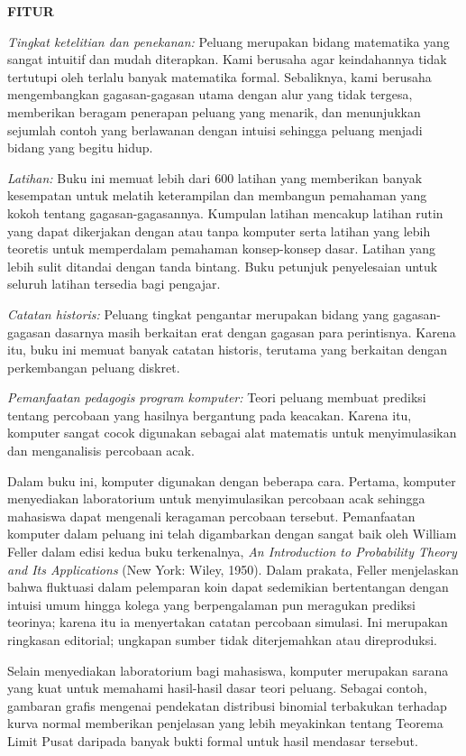 \bigskip\centerline{\bf FITUR}\medskip

{\it Tingkat ketelitian dan penekanan:} Peluang merupakan bidang matematika
yang sangat intuitif dan mudah diterapkan. Kami berusaha agar keindahannya
tidak tertutupi oleh terlalu banyak matematika formal. Sebaliknya, kami
berusaha mengembangkan gagasan-gagasan utama dengan alur yang tidak tergesa,
memberikan beragam penerapan peluang yang menarik, dan menunjukkan sejumlah
contoh yang berlawanan dengan intuisi sehingga peluang menjadi bidang yang
begitu hidup.

{\it Latihan:} Buku ini memuat lebih dari 600 latihan yang memberikan banyak
kesempatan untuk melatih keterampilan dan membangun pemahaman yang kokoh
tentang gagasan-gagasannya. Kumpulan latihan mencakup latihan rutin yang dapat
dikerjakan dengan atau tanpa komputer serta latihan yang lebih teoretis untuk
memperdalam pemahaman konsep-konsep dasar. Latihan yang lebih sulit ditandai
dengan tanda bintang. Buku petunjuk penyelesaian untuk seluruh latihan tersedia
bagi pengajar.

{\it Catatan historis:} Peluang tingkat pengantar merupakan bidang yang
gagasan-gagasan dasarnya masih berkaitan erat dengan gagasan para perintisnya.
Karena itu, buku ini memuat banyak catatan historis, terutama yang berkaitan
dengan perkembangan peluang diskret.

{\it Pemanfaatan pedagogis program komputer:} Teori peluang membuat prediksi
tentang percobaan yang hasilnya bergantung pada keacakan. Karena itu, komputer
sangat cocok digunakan sebagai alat matematis untuk menyimulasikan dan
menganalisis percobaan acak.

Dalam buku ini, komputer digunakan dengan beberapa cara. Pertama, komputer
menyediakan laboratorium untuk menyimulasikan percobaan acak sehingga
mahasiswa dapat mengenali keragaman percobaan tersebut. Pemanfaatan komputer
dalam peluang ini telah digambarkan dengan sangat baik oleh William Feller
dalam edisi kedua buku terkenalnya, {\it An Introduction to Probability Theory
and Its Applications} (New York: Wiley, 1950). Dalam prakata, Feller menjelaskan
bahwa fluktuasi dalam pelemparan koin dapat sedemikian bertentangan dengan
intuisi umum hingga kolega yang berpengalaman pun meragukan prediksi teorinya;
karena itu ia menyertakan catatan percobaan simulasi. Ini merupakan ringkasan
editorial; ungkapan sumber tidak diterjemahkan atau direproduksi.

Selain menyediakan laboratorium bagi mahasiswa, komputer merupakan sarana yang
kuat untuk memahami hasil-hasil dasar teori peluang. Sebagai contoh, gambaran
grafis mengenai pendekatan distribusi binomial terbakukan terhadap kurva normal
memberikan penjelasan yang lebih meyakinkan tentang Teorema Limit Pusat
daripada banyak bukti formal untuk hasil mendasar tersebut.

